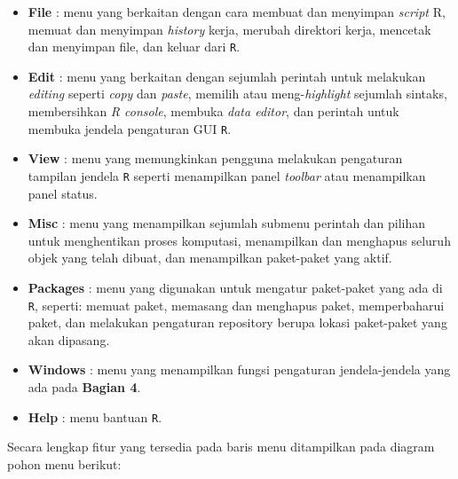 \documentclass[12pt,]{krantz}
\providecommand{\tightlist}{%
  \setlength{\itemsep}{0pt}\setlength{\parskip}{0pt}}
\begin{document}
\begin{itemize}
\tightlist
\item
  \textbf{File} : menu yang berkaitan dengan cara membuat dan menyimpan \emph{script} R, memuat dan menyimpan \emph{history} kerja, merubah direktori kerja, mencetak dan menyimpan file, dan keluar dari \texttt{R}.
\item
  \textbf{Edit} : menu yang berkaitan dengan sejumlah perintah untuk melakukan \emph{editing} seperti \emph{copy} dan \emph{paste}, memilih atau meng-\emph{highlight} sejumlah sintaks, membersihkan \emph{R console}, membuka \emph{data editor}, dan perintah untuk membuka jendela pengaturan GUI \texttt{R}.
\item
  \textbf{View} : menu yang memungkinkan pengguna melakukan pengaturan tampilan jendela \texttt{R} seperti menampilkan panel \emph{toolbar} atau menampilkan panel status.
\item
  \textbf{Misc} : menu yang menampilkan sejumlah submenu perintah dan pilihan untuk menghentikan proses komputasi, menampilkan dan menghapus seluruh objek yang telah dibuat, dan menampilkan paket-paket yang aktif.
\item
  \textbf{Packages} : menu yang digunakan untuk mengatur paket-paket yang ada di \texttt{R}, seperti: memuat paket, memasang dan menghapus paket, memperbaharui paket, dan melakukan pengaturan repository berupa lokasi paket-paket yang akan dipasang.
\item
  \textbf{Windows} : menu yang menampilkan fungsi pengaturan jendela-jendela yang ada pada \textbf{Bagian 4}.
\item
  \textbf{Help} : menu bantuan \texttt{R}.
\end{itemize}

Secara lengkap fitur yang tersedia pada baris menu ditampilkan pada diagram pohon menu berikut:
\end{document}
